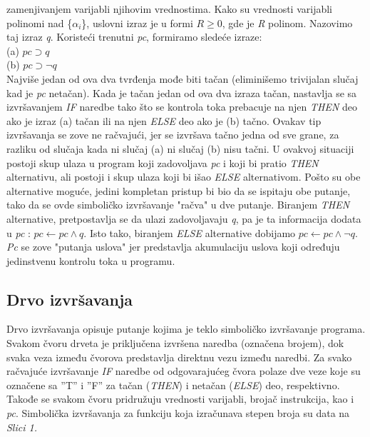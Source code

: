 \documentclass[a4paper]{article}
\begin{document}
{zamenjivanjem varijabli njihovim vrednostima. Kako su vrednosti varijabli polinomi nad \{$\alpha_i$\}, uslovni izraz je u formi $R \ge 0$, gde je \textit{R} polinom. Nazovimo taj izraz \textit{q}. Koristeći trenutni \textit{pc}, formiramo sledeće izraze: \\
(a) $pc \supset q$ \\  
(b) $pc \supset \neg q $ \\
Najviše jedan od ova dva tvrđenja mođe biti tačan (eliminišemo trivijalan slučaj kad je \textit{pc} netačan). Kada je tačan jedan od ova dva izraza tačan, nastavlja se sa izvršavanjem \textit{IF} naredbe tako što se kontrola toka prebacuje na njen \textit{THEN} deo ako je izraz (a) tačan ili na njen \textit{ELSE} deo ako je (b) tačno. Ovakav tip izvršavanja se zove ne račvajući, jer se izvršava tačno jedna od sve grane, za razliku od slučaja kada ni slučaj (a) ni slučaj (b) nisu tačni. U ovakvoj situaciji postoji skup ulaza u program koji zadovoljava \textit{pc} i koji bi pratio \textit{THEN} alternativu, ali postoji i skup ulaza koji bi išao \textit{ELSE} alternativom. Pošto su obe alternative moguće, jedini kompletan pristup bi bio da se ispitaju obe putanje, tako da se ovde simboličko izvršavanje "račva"  u dve putanje. Biranjem \textit{THEN} alternative, pretpostavlja se da ulazi zadovoljavaju \textit{q}, pa je ta informacija dodata u \textit{pc} : $ pc \gets pc \wedge q $. Isto tako, biranjem \textit{ELSE} alternative dobijamo 
$ pc \gets pc \wedge \neg q $. \textit{Pc} se zove "putanja uslova" jer predstavlja akumulaciju uslova koji određuju jedinstvenu kontrolu toka u programu.

\subsection{Drvo izvršavanja}
Drvo izvršavanja opisuje putanje kojima je teklo simboličko izvršavanje programa. Svakom čvoru drveta je priključena izvršena naredba (označena brojem), dok svaka veza između čvorova predstavlja direktnu vezu između naredbi. Za svako račvajuće izvršavanje \textit{IF} naredbe od odgovarajućeg čvora polaze dve veze koje su označene sa ''T'' i ''F'' za tačan (\textit{THEN}) i netačan (\textit{ELSE}) deo, respektivno. Takođe se svakom čvoru pridružuju vrednosti varijabli, brojač instrukcija, kao i \textit {pc}. Simbolička izvršavanja za funkciju koja izračunava stepen broja su data na \textit {Slici 1.}

}
\end{document}
